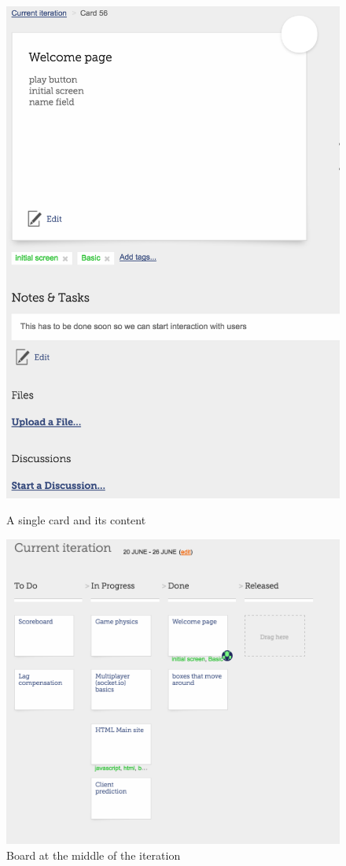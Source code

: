 \documentclass{article}
\renewcommand{\_}{\char`_}
\begin{document}
\begin{figure}[ht]
\begin{minipage}[b]{0.5\linewidth}
    \includegraphics[width=.6\linewidth]{card} 
    \caption{A single card and its content} 
    \vspace{4ex}
  \end{minipage} 
  \begin{minipage}[b]{0.5\linewidth}
    \centering
    \includegraphics[width=.85\linewidth]{middle} 
    \caption{Board at the middle of the iteration} 
    \vspace{4ex}
  \end{minipage}%
  \begin{minipage}[b]{0.5\linewidth}

\end{minipage}
\end{figure}
\end{document}

